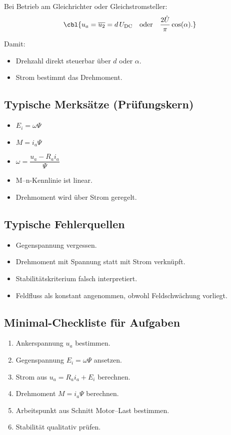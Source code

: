 Bei Betrieb am Gleichrichter oder Gleichstromsteller:
\[
\cbl{u_a = \overline{u_2} = d \, U_{\mathrm{DC}} \quad \text{oder} \quad \frac{2\hat U}{\pi} \cos(\alpha).}
\]

Damit:
\begin{itemize}
    \item Drehzahl direkt steuerbar über $d$ oder $\alpha$.
    \item Strom bestimmt das Drehmoment.
\end{itemize}

\subsection{Typische Merksätze (Prüfungskern)}

\begin{itemize}
    \item $E_i = \omega \Psi$
    \item $M = i_a \Psi$
    \item $\omega = \dfrac{u_a - R_a i_a}{\Psi}$
    \item M--n-Kennlinie ist linear.
    \item Drehmoment wird über Strom geregelt.
\end{itemize}

\subsection{Typische Fehlerquellen}

\begin{itemize}
    \item Gegenspannung vergessen.
    \item Drehmoment mit Spannung statt mit Strom verknüpft.
    \item Stabilitätskriterium falsch interpretiert.
    \item Feldfluss als konstant angenommen, obwohl Feldschwächung vorliegt.
\end{itemize}

\subsection{Minimal-Checkliste für Aufgaben}

\begin{enumerate}
    \item Ankerspannung $u_a$ bestimmen.
    \item Gegenspannung $E_i = \omega \Psi$ ansetzen.
    \item Strom aus $u_a = R_a i_a + E_i$ berechnen.
    \item Drehmoment $M = i_a \Psi$ berechnen.
    \item Arbeitspunkt aus Schnitt Motor–Last bestimmen.
    \item Stabilität qualitativ prüfen.
\end{enumerate}
